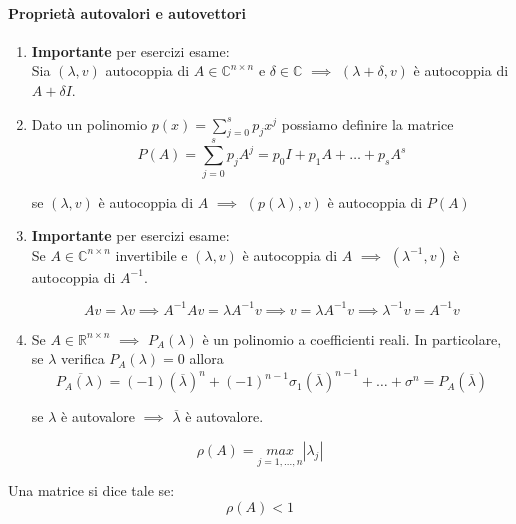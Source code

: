 \documentclass[12pt,a4paper,]{report}
\begin{document}
\paragraph{Proprietà autovalori e autovettori}
\begin{enumerate}
    \item \textbf{Importante} per esercizi esame:\\
    Sia $(\lambda, v)$ autocoppia di $A \in \mathbb{C}^{n\times n}$ e $\delta \in \mathbb{C}$ $\implies$ $(\lambda + \delta, v)$ è autocoppia di $A + \delta I$.
    
    \item Dato un polinomio $p(x) = \displaystyle\sum_{j=0}^{s} p_j x^j$ possiamo definire la matrice
    \[
    P(A) = \sum_{j=0}^{s} p_j A^j = p_0 I + p_1 A + \ldots + p_s A^s
    \]
    
    se $(\lambda, v)$ è autocoppia di $A$ $\implies$ $(p(\lambda), v)$ è autocoppia di $P(A)$
    
    \item \label{item: proprieta autovalori inversa} \textbf{Importante} per esercizi esame:\\
    Se $A \in \mathbb{C}^{n\times n}$ invertibile e $(\lambda, v)$ è autocoppia di $A$ $\implies$ $(\lambda^{-1}, v)$ è autocoppia di $A^{-1}$.
    \begin{dimostrazionelibera}
        \[
        Av= \lambda v \implies A^{-1}Av = \lambda A^{-1}v \implies v = \lambda A^{-1}v \implies \lambda^{-1} v = A^{-1}v
        \]
    \end{dimostrazionelibera}
    \item Se $A \in \mathbb{R}^{n\times n}$ $\implies$ $P_A(\lambda)$ è un polinomio a coefficienti reali. In particolare, se $\lambda$ verifica $P_A(\lambda) = 0$ allora
    \[
    \overline{P_A(\lambda)} = (-1)(\overline{\lambda})^n + (-1)^{n-1}\sigma_1(\overline{\lambda})^{n-1} + \ldots + \sigma^n = P_A(\overline{\lambda})
    \]
    
    se $\lambda$ è autovalore $\implies$ $\overline{\lambda}$ è autovalore.
\end{enumerate}
\begin{definizione}
    \[
    \rho(A) = \underset{j= 1, ..., n}{max} |\lambda_j|
    \]
\end{definizione}
\begin{definizione}
    Una matrice si dice tale se:
    $$\rho(A)<1$$
\end{definizione}
\end{document}
